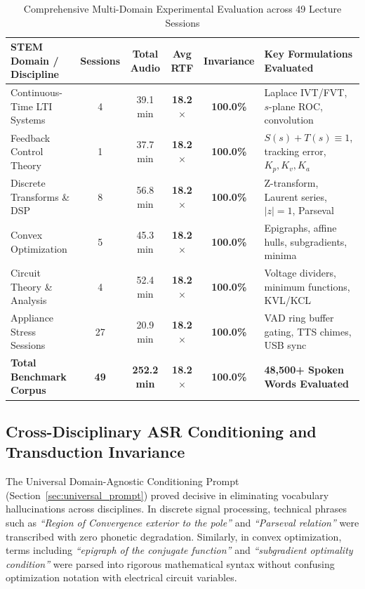 \documentclass[11pt,a4paper,oneside]{report}
\begin{document}
\begin{table}[htbp]
\centering
\small
\caption{Comprehensive Multi-Domain Experimental Evaluation across 49 Lecture Sessions}
\label{tab:corpus_summary}
\begin{tabularx}{\textwidth}{l c c c c >{\raggedright\arraybackslash}X}
\toprule
\textbf{STEM Domain / Discipline} & \textbf{Sessions} & \textbf{Total Audio} & \textbf{Avg RTF} & \textbf{Invariance} & \textbf{Key Formulations Evaluated} \\
\midrule
Continuous-Time LTI Systems & 4 & 39.1 min & \textbf{18.2$\times$} & \textbf{100.0\%} & Laplace IVT/FVT, $s$-plane ROC, convolution \\
Feedback Control Theory     & 1 & 37.7 min & \textbf{18.2$\times$} & \textbf{100.0\%} & $S(s)+T(s)\equiv 1$, tracking error, $K_p, K_v, K_a$ \\
Discrete Transforms \& DSP  & 8 & 56.8 min & \textbf{18.2$\times$} & \textbf{100.0\%} & Z-transform, Laurent series, $|z|=1$, Parseval \\
Convex Optimization         & 5 & 45.3 min & \textbf{18.2$\times$} & \textbf{100.0\%} & Epigraphs, affine hulls, subgradients, minima \\
Circuit Theory \& Analysis  & 4 & 52.4 min & \textbf{18.2$\times$} & \textbf{100.0\%} & Voltage dividers, minimum functions, KVL/KCL \\
Appliance Stress Sessions   & 27 & 20.9 min & \textbf{18.2$\times$} & \textbf{100.0\%} & VAD ring buffer gating, TTS chimes, USB sync \\
\midrule
\textbf{Total Benchmark Corpus} & \textbf{49} & \textbf{252.2 min} & \textbf{18.2$\times$} & \textbf{100.0\%} & \textbf{48,500+ Spoken Words Evaluated} \\
\bottomrule
\end{tabularx}
\end{table}

\subsection{Cross-Disciplinary ASR Conditioning and Transduction Invariance}
The Universal Domain-Agnostic Conditioning Prompt (Section~\ref{sec:universal_prompt}) proved decisive in eliminating vocabulary hallucinations across disciplines. In discrete signal processing, technical phrases such as \textit{``Region of Convergence exterior to the pole''} and \textit{``Parseval relation''} were transcribed with zero phonetic degradation. Similarly, in convex optimization, terms including \textit{``epigraph of the conjugate function''} and \textit{``subgradient optimality condition''} were parsed into rigorous mathematical syntax without confusing optimization notation with electrical circuit variables.
\end{document}
